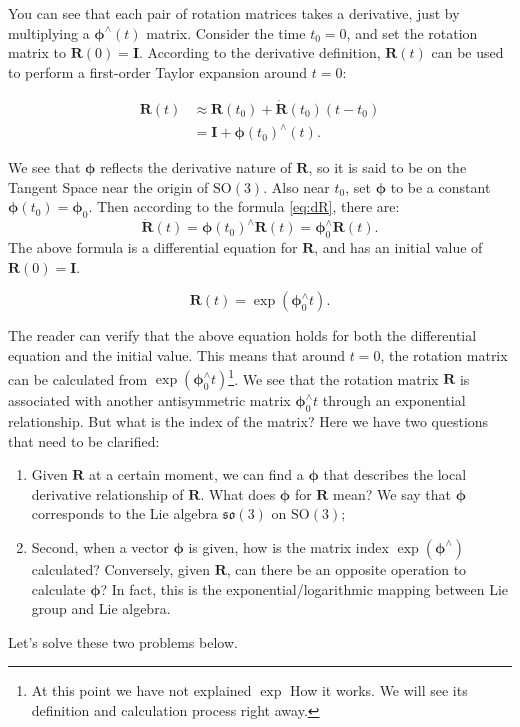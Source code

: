 You can see that each pair of rotation matrices takes a derivative, just by multiplying a $\boldsymbol{\phi}^\wedge (t)$ matrix. Consider the time $t_0=0$, and set the rotation matrix to $\bm{R}(0) = \bm{I}$. According to the derivative definition, $\bm{R}(t)$ can be used to perform a first-order Taylor expansion around $t=0$:

\begin{equation}
\begin{aligned}
  \bm{R} \left( t \right) & \approx \bm{R} \left( t_0 \right) + \dot {\bm{R}} \left( {{t_0}} \right)\left( {t - {t_0}} \right)\\
  &= \bm{I} + \boldsymbol{\phi} {\left( {{t_0}} \right)^ \wedge } \left( t \right).
\end{aligned}
\end{equation}

We see that $\boldsymbol{\phi}$ reflects the derivative nature of $\bm{R}$, so it is said to be on the Tangent Space near the origin of $\mathrm{SO}(3)$. Also near $t_0$, set $\boldsymbol{\phi}$ to be a constant $\boldsymbol{\phi}(t_0) = \boldsymbol{\phi}_0$. Then according to the formula \eqref{eq:dR}, there are:
\[
\bm{ \dot{R} } (t) = \boldsymbol{\phi} (t_0) ^ {\wedge} \bm{R}(t) = \boldsymbol{\phi}_0^ {\wedge} \bm{R}(t).
\]
The above formula is a differential equation for $\bm{R}$, and has an initial value of $\bm{R}(0) = \bm{I}$.

\begin{equation}
\label{eq:so3ode}
\bm{R}(t) = \exp \left( \boldsymbol{\phi}_0^\wedge t \right).
\end{equation}

The reader can verify that the above equation holds for both the differential equation and the initial value. This means that around $t = 0$, the rotation matrix can be calculated from $\exp \left( \boldsymbol{\phi}_0^\wedge t \right)$\footnote{At this point we have not explained $\exp$ How it works. We will see its definition and calculation process right away. }. We see that the rotation matrix $\bm{R}$ is associated with another antisymmetric matrix $\boldsymbol{\phi}_0^\wedge t$ through an exponential relationship. But what is the index of the matrix? Here we have two questions that need to be clarified:
\begin{enumerate}
	\item Given $\bm{R}$ at a certain moment, we can find a $\boldsymbol{\phi}$ that describes the local derivative relationship of $\bm{R}$. What does $\boldsymbol{\phi}$ for $\bm{R}$ mean? We say that $\boldsymbol{\phi}$ corresponds to the Lie algebra $\mathfrak{so}(3)$ on $\mathrm{SO}(3)$;
	\item Second, when a vector $\boldsymbol{\phi}$ is given, how is the matrix index $\exp (\boldsymbol{\phi} ^\wedge )$ calculated? Conversely, given $\bm{R}$, can there be an opposite operation to calculate $\boldsymbol{\phi}$? In fact, this is the exponential/logarithmic mapping between Lie group and Lie algebra.
\end{enumerate}

Let's solve these two problems below.

